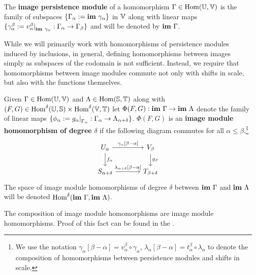 \begin{definition}
  The \textbf{image persistence module} of a homomorphism $\Gamma\in\mathrm{Hom}(\mathbb{U},\mathbb{V})$ is the family of subspaces $\{\Gamma_\alpha :=\mathbf{im}~\gamma_\alpha\}$ in $\mathbb{V}$ along with linear maps $\{\gamma_\alpha^\beta := v_\alpha^\beta\mathord{\mid}_{\mathbf{im}~\gamma_\alpha} : \Gamma_\alpha\to\Gamma_\beta\}$ and will be denoted by $\mathbf{im}~\Gamma$.
\end{definition}

While we will primarily work with homomorphisms of persistence modules induced by inclusions, in general, defining homomorphisms between images simply as subspaces of the codomain is not sufficient.
Instead, we require that homomorphisms between image modules commute not only with shifts in scale, but also with the functions themselves.

\begin{definition}
  Given $\Gamma\in\mathrm{Hom}(\mathbb{U},\mathbb{V})$ and $\Lambda\in\mathrm{Hom}(\mathbb{S},\mathbb{T})$ along with $(F,G)\in\mathrm{Hom}^\delta(\mathbb{U},\mathbb{S})\times\mathrm{Hom}^\delta(\mathbb{V},\mathbb{T})$ let $\Phi(F, G) : \mathbf{im}~\Gamma\to\mathbf{im}~\Lambda$ denote the family of linear maps $\{\phi_\alpha := g_\alpha\mathord{\mid}_{\Gamma_\alpha} : \Gamma_\alpha\to\Lambda_{\alpha+\delta}\}$.
  $\Phi(F, G)$ is an \textbf{image module homomorphism of degree $\delta$} if the following diagram commutes for all $\alpha\leq\beta$.\footnote{We use the notation $\gamma_\alpha[\beta-\alpha] = v_\alpha^\beta\circ\gamma_\alpha$, $\lambda_\alpha[\beta-\alpha] = t_\alpha^\beta\circ\lambda_\alpha$ to denote the composition of homomorphisms between persistence modules and shifts in scale.}
  \begin{equation}\label{dgm:image_homomorphism}
    \begin{tikzcd}[column sep=large]
        U_\alpha\arrow{r}{\gamma_\alpha[\beta-\alpha]}\arrow{d}{f_\alpha} &
      V_\beta\arrow{d}{g_\beta}\\
      S_{\alpha+\delta}\arrow{r}{\lambda_{\alpha+\delta}[\beta-\alpha]} &
      T_{\beta +\delta}
  \end{tikzcd}\end{equation}
  The space of image module homomorphisms of degree $\delta$ between $\mathbf{im}~\Gamma$ and $\mathbf{im}~\Lambda$ will be denoted $\mathrm{Hom}^\delta(\mathbf{im}~\Gamma,\mathbf{im}~\Lambda)$.
\end{definition}
%
%
%
The composition of image module homomorphisms are image module homomorphisms.
Proof of this fact can be found in the \fullversion.

